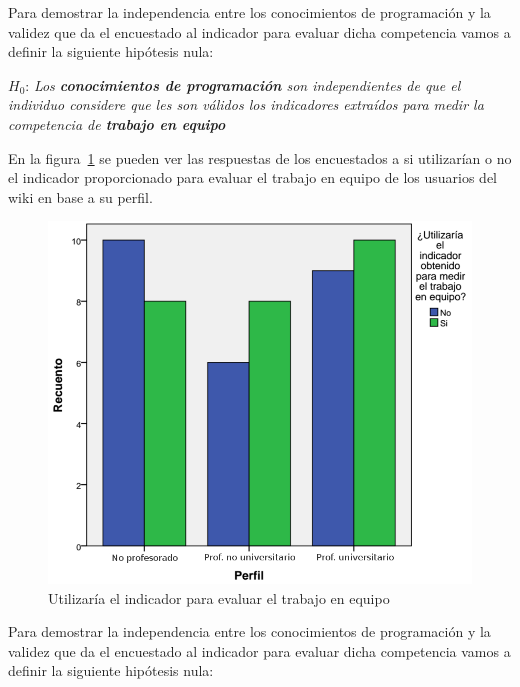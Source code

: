 Para demostrar la independencia entre los conocimientos de programación y la validez que da el encuestado al indicador para evaluar dicha competencia vamos a definir la siguiente hipótesis nula:

\begin{mdframed}[style=hipotesis0]
$H_0$: \emph{Los \textbf{conocimientos de programación} son independientes de que el individuo considere que les son válidos los indicadores extraídos para medir la competencia de \textbf{trabajo en equipo}}
\end{mdframed}


En la figura~\ref{fig:app:barras:perfil:equipo} se pueden ver las respuestas de los encuestados a si utilizarían o no el indicador proporcionado para evaluar el trabajo en equipo de los usuarios del wiki en base a su perfil.

\begin{figure}
  \begin{center}
    \includegraphics[scale=0.3]{barras_perfil_equipo.png}
  \end{center}
  \caption{Utilizaría el indicador para evaluar el trabajo en equipo}
  \label{fig:app:barras:perfil:equipo}
\end{figure}

Para demostrar la independencia entre los conocimientos de programación y la validez que da el encuestado al indicador para evaluar dicha competencia vamos a definir la siguiente hipótesis nula:

